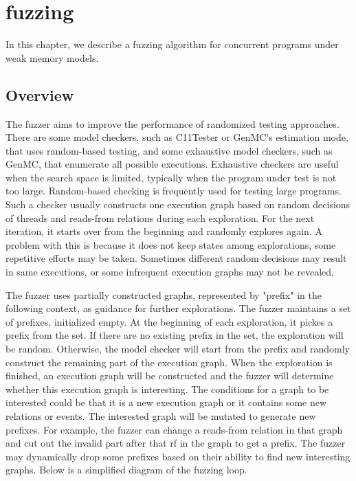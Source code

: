\chapter{\label{cha:title}fuzzing}

In this chapter, we describe a fuzzing algorithm for concurrent programs under weak memory models.

\section{Overview}

The fuzzer aims to improve the performance of randomized testing approaches. There are some model checkers, such as C11Tester or GenMC's estimation mode, that uses random-based testing, and some exhaustive model checkers, such as GenMC, that enumerate all possible executions. Exhaustive checkers are useful when the search space is limited, typically when the program under test is not too large. Random-based checking is frequently used for testing large programs. Such a checker usually constructs one execution graph based on random decisions of threads and reads-from relations during each exploration. For the next iteration, it starts over from the beginning and randomly explores again. A problem with this is because it does not keep states among explorations, some repetitive efforts may be taken. Sometimes different random decisions may result in same executions, or some infrequent execution graphs may not be revealed. 

The fuzzer uses partially constructed graphs, represented by "prefix" in the following context, as guidance for further explorations. 
The fuzzer maintains a set of prefixes, initialized empty. At the beginning of each exploration, it pickes a prefix from the set. If there are no existing prefix in the set, the exploration will be random. Otherwise, the model checker will start from the prefix and randomly construct the remaining part of the execution graph. When the exploration is finished, an execution graph will be constructed and the fuzzer will determine whether this execution graph is interesting. The conditions for a graph to be interested could be that it is a new execution graph or it contains some new relations or events. The interested graph will be mutated to generate new prefixes. For example, the fuzzer can change a reads-from relation in that graph and cut out the invalid part after that rf in the graph to get a prefix. The fuzzer may dynamically drop some prefixes based on their ability to find new interesting graphs. Below is a simplified diagram of the fuzzing loop.



